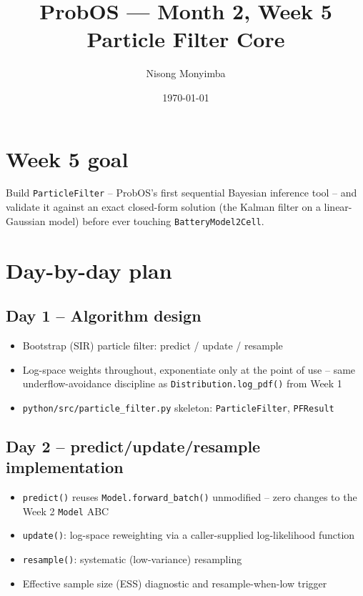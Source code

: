\documentclass[11pt]{article}
\title{ProbOS --- Month 2, Week 5\\Particle Filter Core}
\author{Nisong Monyimba}
\date{\today}
\begin{document}
\maketitle

\section*{Week 5 goal}
Build \texttt{ParticleFilter} -- ProbOS's first sequential Bayesian
inference tool -- and validate it against an exact closed-form
solution (the Kalman filter on a linear-Gaussian model) before ever
touching \texttt{BatteryModel2Cell}.

\section*{Day-by-day plan}

\subsection*{Day 1 -- Algorithm design}
\begin{itemize}[leftmargin=*]
  \item Bootstrap (SIR) particle filter: predict / update / resample
  \item Log-space weights throughout, exponentiate only at the point of
    use -- same underflow-avoidance discipline as
    \texttt{Distribution.log\_pdf()} from Week 1
  \item \texttt{python/src/particle\_filter.py} skeleton:
    \texttt{ParticleFilter}, \texttt{PFResult}
\end{itemize}

\subsection*{Day 2 -- predict/update/resample implementation}
\begin{itemize}[leftmargin=*]
  \item \texttt{predict()} reuses \texttt{Model.forward\_batch()}
    unmodified -- zero changes to the Week 2 \texttt{Model} ABC
  \item \texttt{update()}: log-space reweighting via a caller-supplied
    log-likelihood function
  \item \texttt{resample()}: systematic (low-variance) resampling
  \item Effective sample size (ESS) diagnostic and resample-when-low
    trigger
\end{itemize}
\end{document}
